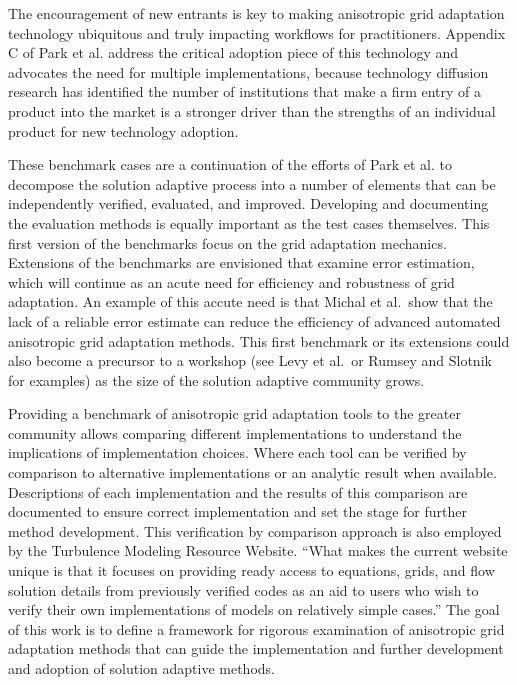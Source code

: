 \documentclass[3p,times,procedia,number]{elsarticle}
\begin{document}
The encouragement of new entrants is key to making
anisotropic grid adaptation technology ubiquitous and truly impacting
workflows for practitioners.
Appendix C of Park et al.\cite{park-unstruct-adapt-status-cfd2030}
address the critical adoption piece of this technology and
advocates the need for multiple implementations, 
because technology diffusion research has identified the
number of institutions that make a firm entry of a product
into the market is a stronger driver than the strengths of an individual
product for new technology
adoption.\cite{agarwal-bayus-market-evo-takeoff-innovation}

These benchmark cases are a continuation of the efforts of
Park et al.\cite{park-loseille-krakos-michal-adapt-decomposition}
to decompose the solution adaptive process into a number of
elements that can be independently verified, evaluated, and improved.
Developing and documenting the evaluation methods is equally important
as the test cases themselves.
This first version of the benchmarks focus on the grid adaptation
mechanics.
Extensions of the benchmarks are envisioned that examine error
estimation, which will continue as an acute need for
efficiency and robustness of grid adaptation.
An example of this accute need is that
Michal et al.\cite{michal-unstruct-adapt-epic-dpw6}~show that
the lack of a reliable error estimate can reduce the efficiency of advanced
automated anisotropic grid adaptation methods.
This first benchmark or its extensions could also become a
precursor to a workshop (see Levy et al.\cite{dpw5-summary}~or
Rumsey and Slotnik\cite{rumsey-slotnick-summary-highliftpw2} for examples)
as the size of the solution adaptive community grows.

Providing a benchmark
of anisotropic grid adaptation tools 
to the greater community
allows comparing different implementations
to understand the implications of implementation choices.
Where each tool can be verified
by comparison to alternative implementations or
an analytic result when available.
Descriptions of each implementation and the
results of this comparison are documented to ensure correct implementation
and set the stage for further method development.
This verification by comparison approach is also employed by the
Turbulence Modeling Resource Website.\cite{rumsey-smith-huang-turbmodels-description}
``What makes the current website unique is that it focuses on
providing ready access to equations, grids, and flow solution details
from previously verified codes as an aid to users
who wish to verify their own implementations of models on
relatively simple cases.''\cite{rumsey-smith-huang-turbmodels-description}
The goal of this work is to define a framework for
rigorous examination of anisotropic grid adaptation methods
that can guide the implementation and
further development and adoption of solution adaptive methods.
\end{document}
